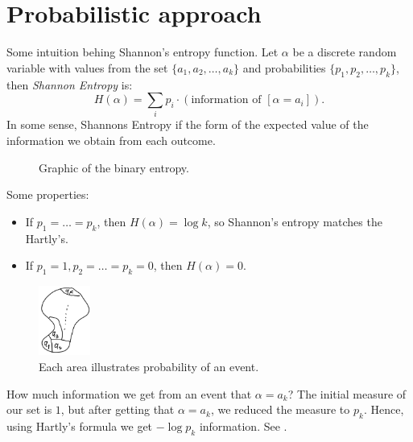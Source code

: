 
\section{Probabilistic approach}

Some intuition behing Shannon's entropy function.
Let $\alpha$ be a discrete random variable with values from the set $\{a_1, a_2, \ldots, a_k\}$ and probabilities $\{p_1, p_2, \ldots, p_k\}$, then \emph{Shannon Entropy} is:
\[
    H(\alpha) = \sum_i p_i \cdot (\text{information of } [\alpha = a_i]).
\]
In some sense, Shannons Entropy if the form of the expected value of the information we obtain from each outcome.

\begin{figure}[H]
    \centering
    \caption{Graphic of the binary entropy.}
    \label{fig:telegram-cloud-document-2-5244613392966114249}
\end{figure}

Some properties:
\begin{itemize}
    \item If $p_1 = \dots = p_k$, then $H(\alpha) = \log k$, so Shannon's entropy matches the Hartly's.
    \item If $p_1 = 1, p_2 = \dots = p_k = 0$, then $H(\alpha) = 0$.
\end{itemize}

\begin{figure}[H]
    \centering
    \includegraphics[width=0.15\textwidth]{figures/42D86984-D9AD-47FE-A062-3B83675568DA}
    \caption{Each area illustrates probability of an event.}
    \label{fig:42d86984-d9ad-47fe-a062-3b83675568da}
\end{figure}

How much information we get from an event that $\alpha = a_k$?
The initial measure of our set is $1$, but after getting that $\alpha = a_k$, we reduced the measure to $p_k$.
Hence, using Hartly's formula we get $-\log p_k$ information.
See .

